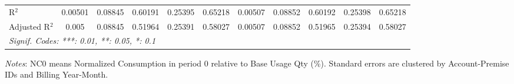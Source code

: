 \begin{table}[htbp]
\begin{adjustbox}{scale = 0.7}
\begin{tabular}{lcccccccccc}
R$^2$ & 0.00501&0.08845&0.60191&0.25395&0.65218&0.00507&0.08852&0.60192&0.25398&0.65218\\
Adjusted R$^2$ & 0.005&0.08845&0.51964&0.25391&0.58027&0.00507&0.08852&0.51965&0.25394&0.58027\\
\bottomrule\bottomrule
\multicolumn{11}{l}{\emph{Signif. Codes: ***: 0.01, **: 0.05, *: 0.1}}\\
\end{tabular}
\end{adjustbox}
\begin{tablenotes}
\footnotesize
\emph{\medskip Notes}: NC0 means Normalized Consumption in period 0 relative to Base Usage Qty (\%). Standard errors are clustered by Account-Premise IDs and Billing Year-Month.
\end{tablenotes}
\end{table}